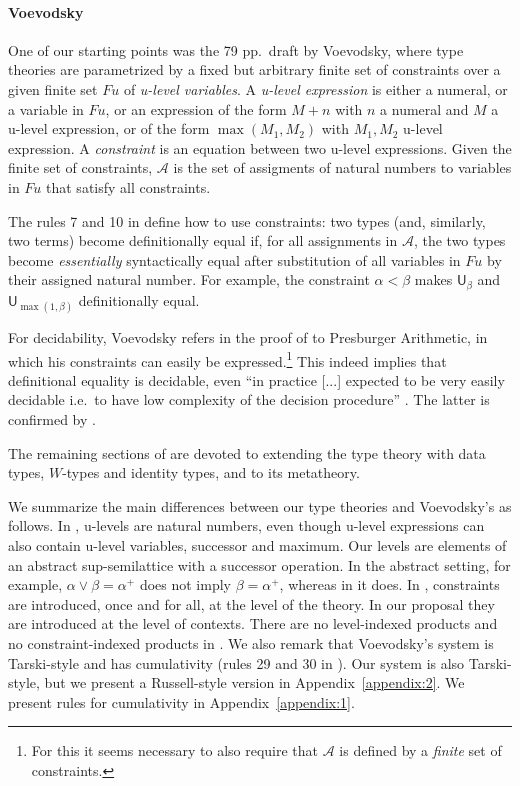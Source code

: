\documentclass[a4paper,UKenglish,cleveref, autoref, thm-restate]{lipics-v2021}
\newcommand{\UU}{\mathsf{U}}
\newcommand{\AFu}{\mathcal{A}}
\newcommand{\Fu}{\mathit{Fu}}
\begin{document}
\paragraph*{Voevodsky} One of our starting points was the 79 pp.\ draft \cite{VV} by Voevodsky, where type theories are parametrized by a fixed but arbitrary finite set of constraints over a given finite
set $\Fu$ of \emph{u-level variables}. A \emph{u-level expression} \cite[Def. 2.0.2]{VV} is either a numeral,
or a variable in $\Fu$, or an expression of the form $M+n$ with $n$
a numeral and $M$ a u-level expression, or of the form $\max(M_1,M_2)$
with $M_1,M_2$ u-level expression. A \emph{constraint} is an equation
between two u-level expressions. Given the finite set of constraints,
$\AFu$ is the set of assigments of natural numbers to variables
in $\Fu$ that satisfy all constraints.

The rules 7 and 10 in \cite[Section 3.4]{VV} define how to use constraints:
two types (and, similarly, two terms) become definitionally equal
if, for all assignments in $\AFu$, the two types become \emph{essentially}
syntactically equal after substitution of all variables in $\Fu$ by
their assigned natural number. For example, the constraint
$\alpha < \beta$ makes $\UU_\beta$ and $\UU_{\max(1,\beta)}$
definitionally equal.

For decidability, Voevodsky refers in the proof of
\cite[Lemma 2.0.4, proof]{VV} to Presburger Arithmetic,
in which his constraints can easily be expressed.\footnote{%
For this it seems necessary to also require that $\AFu$
is defined by a \emph{finite} set of constraints.}%
This indeed implies that definitional equality is decidable, even
``in practice [...] expected to be very easily decidable i.e.\
to have low complexity of the decision procedure''
\cite[p.\ 5, l.\ -13]{VV}.
The latter is confirmed by \cite{bezem-coquand:lattices}.

The remaining sections of \cite{VV} are devoted to extending the
type theory with data types, $W$-types and identity types,
and to its metatheory.

We summarize the main differences between our type theories
and Voevodsky's as follows.
%
In \cite{VV}, u-levels are natural numbers, even though u-level
expressions can also contain u-level variables, successor and maximum.
Our levels are elements of an abstract sup-semilattice with a successor
operation. In the abstract setting, for example,
$\alpha\vee\beta=\alpha^+$ does not imply $\beta=\alpha^+$,
whereas in \cite{VV} it does.
%
In \cite{VV}, constraints are introduced, once and for all,
at the level of the theory. In our proposal they are introduced
at the level of contexts.
There are no level-indexed products and no constraint-indexed products in \cite{VV}.
We also remark that Voevodsky's system is Tarski-style and has cumulativity (rules 29 and 30 in \cite[Section 3.4]{VV}). Our system is also Tarski-style, but we present a Russell-style version in Appendix~\ref{appendix:2}. We present rules for cumulativity in Appendix~\ref{appendix:1}.
\end{document}
